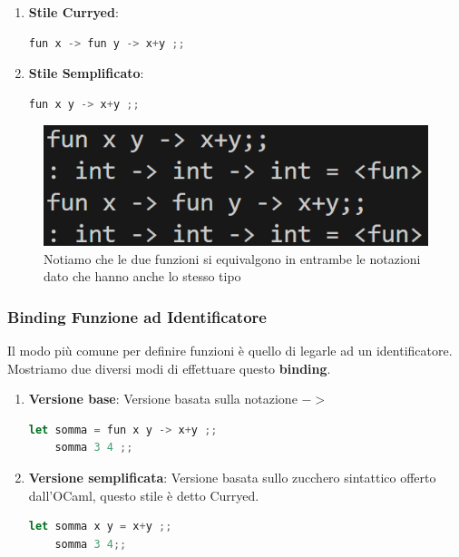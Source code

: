 \documentclass{article}
\begin{document}
\begin{enumerate}
    \item \textbf{Stile Curryed}:
    \vspace*{10px}
    \begin{lstlisting}[language = JavaScript]
    fun x -> fun y -> x+y ;;
    \end{lstlisting}
    \vspace*{-10px}
    \item \textbf{Stile Semplificato}:
    \vspace*{10px}
    \begin{lstlisting}[language = JavaScript]
    fun x y -> x+y ;;
    \end{lstlisting}
    \vspace*{-10px}
\end{enumerate}

\begin{figure}[htbp]
    \center
    \includegraphics[scale=0.4]{img/notazioneFunzioni.png}
    \caption{Notiamo che le due funzioni si equivalgono in entrambe le notazioni dato che hanno anche lo stesso tipo}
\end{figure}

\vspace*{15px}

\subsubsection{Binding Funzione ad Identificatore}

Il modo più comune per definire funzioni è quello di legarle ad un identificatore. Mostriamo due diversi modi di effettuare questo \textbf{binding}.

\begin{enumerate}
    \item \textbf{Versione base}: Versione basata sulla notazione $->$
    \vspace*{10px}
    \begin{lstlisting}[language = JavaScript]
    let somma = fun x y -> x+y ;;
    somma 3 4 ;;
    \end{lstlisting}
    \vspace*{-10px}
    \item \textbf{Versione semplificata}: Versione basata sullo zucchero sintattico offerto dall'OCaml, questo stile è detto Curryed.
    \vspace*{10px}
    \begin{lstlisting}[language = JavaScript]
    let somma x y = x+y ;;
    somma 3 4;;
    \end{lstlisting}
    \vspace*{-10px}
    
\end{enumerate}
\end{document}
